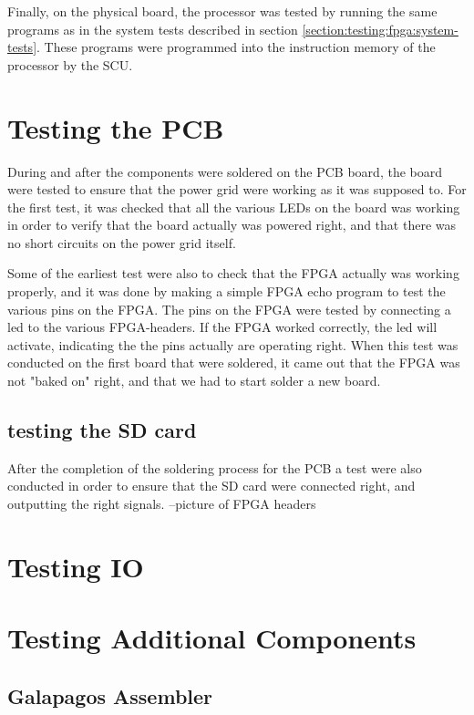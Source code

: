 Finally, on the physical board, the processor was tested by running the same programs as in the system tests described in section \vref{section:testing:fpga:system-tests}.
These programs were programmed into the instruction memory of the processor by the SCU.

\section{Testing the PCB}
During and after the components were soldered on the PCB board, the board were tested to ensure that the power grid were working as it was supposed to.
For the first test, it was checked that all the various LEDs on the board was working in order to verify that the board actually was powered right, and that there was
no short circuits on the power grid itself.

Some of the earliest test were also to check that the FPGA actually was working properly, and it was done by making a simple FPGA echo program to test the various pins on the FPGA.
The pins on the FPGA were tested by connecting a led to the various FPGA-headers. If the FPGA worked correctly, the led will activate, indicating the the pins actually are operating right.
When this test was conducted on the first board that were soldered, it came out that the FPGA was not "baked on" right, and that we had to start solder a new board. 

\subsection{testing the SD card}
After the completion of the soldering process for the PCB a test were also conducted in order to ensure that the 
SD card were connected right, and outputting the right signals. 
--picture of FPGA headers

\section{Testing IO}


\section{Testing Additional Components}

\subsection{Galapagos Assembler}

